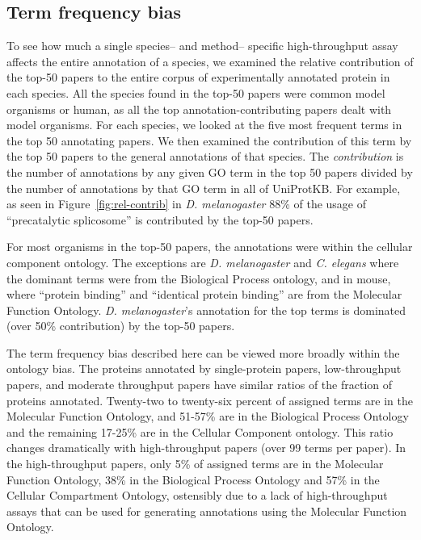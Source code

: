 \documentclass[12pt]{article}
\begin{document}
\subsection*{Term frequency bias}

To see how much a single species-- and method-- specific high-throughput assay affects the entire
annotation of a species, we examined the relative contribution of the top-50 papers to the entire
corpus of experimentally annotated protein in each species.  All the species found in the top-50
papers were common
model organisms or human, as all the top annotation-contributing papers dealt with model organisms.
For each species, we looked at the five most frequent terms in the top 50 annotating papers. We then
examined the contribution of this term by the top 50 papers to the general annotations of that
species.  The \textit{contribution} is the number of annotations by any given GO term in the top 50
papers divided by the number of annotations by that GO term in all of UniProtKB.  For example, as
seen in Figure~\ref{fig:rel-contrib} in \textit{D.  melanogaster} 88\% of the usage of
``precatalytic splicosome'' is contributed by the top-50 papers. 


For most organisms in the top-50 papers,  the annotations were within the cellular component
ontology. The exceptions are \textit{D. melanogaster} and \textit{C. elegans} where the
dominant terms were from the Biological Process ontology, and in mouse, where ``protein
binding'' and ``identical protein binding'' are from the Molecular Function Ontology.
\textit{D. melanogaster}'s annotation for the top terms is dominated (over 50\% contribution)
by the top-50 papers. 

The term frequency bias described here can be viewed more broadly within the ontology bias. The proteins
annotated by single-protein papers, low-throughput papers, and moderate throughput papers 
have similar ratios of the fraction of proteins annotated.  Twenty-two to twenty-six percent of assigned
terms are in the Molecular Function Ontology, and 51-57\% are in the Biological Process Ontology and the
remaining 17-25\% are in the Cellular Component ontology. This ratio changes dramatically with
high-throughput papers (over 99 terms per paper). In the high-throughput papers, only 5\% of assigned
terms are in the Molecular Function Ontology, 38\% in the Biological Process Ontology and 57\% in the
Cellular Compartment Ontology, ostensibly due to a lack of high-throughput assays that can be used for
generating annotations using the Molecular Function Ontology. 
\end{document}
